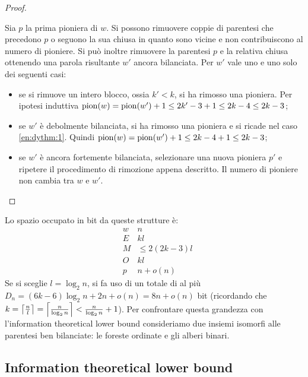 \begin{proof}
\begin{itemize}
\begin{enumerate}
			            Sia $p$ la prima pioniera di $w$. Si possono rimuovere coppie di parentesi che precedono $p$ o seguono la sua chiusa in quanto sono vicine e non contribuiscono al numero di pioniere. Si può inoltre rimuovere la parentesi $p$ e la relativa chiusa ottenendo una parola risultante $w'$ ancora bilanciata. Per $w'$ vale uno e uno solo dei seguenti casi:
			            \begin{itemize}
				            \item se si rimuove un intero blocco, ossia $k'<k$, si ha rimosso una pioniera. Per ipotesi induttiva $\mathrm{pion}(w)=\mathrm{pion}(w')+1\leq 2k'-3+1\leq 2k-4\leq 2k-3$;
				            \item se $w'$ è debolmente bilanciata, si ha rimosso una pioniera e si ricade nel caso \ref{en:dythm:1}. Quindi $\mathrm{pion}(w)=\mathrm{pion}(w')+1\leq 2k-4+1\leq 2k-3$;
				            \item se $w'$ è ancora fortemente bilanciata, selezionare una nuova pioniera $p'$ e ripetere il procedimento di rimozione appena descritto. Il numero di pioniere non cambia tra $w$ e $w'$.
			            \end{itemize}
		      \end{enumerate}
	\end{itemize}
\end{proof}

Lo spazio occupato in bit da queste strutture è:
\begin{equation*}
	\begin{aligned}
		 & w & n             \\
		 & E & k l           \\
		 & M & \leq 2(2k-3)l \\
		 & O & kl            \\
		 & p & n + o(n)
	\end{aligned}
\end{equation*}
Se si sceglie $l=\log_2 n$, si fa uso di un totale di al più $D_n=(6k-6)\log_2 n+2n+o(n)=8n+o(n)$ bit (ricordando che $k=\left\lceil \frac nl \right\rceil=\left\lceil \frac{n}{\log_2 n} \right\rceil<\frac{n}{\log_2 n}+1$).
Per confrontare questa grandezza con l'information theoretical lower bound consideriamo due insiemi isomorfi alle parentesi ben bilanciate: le foreste ordinate e gli alberi binari.


\subsection{Information theoretical lower bound}

